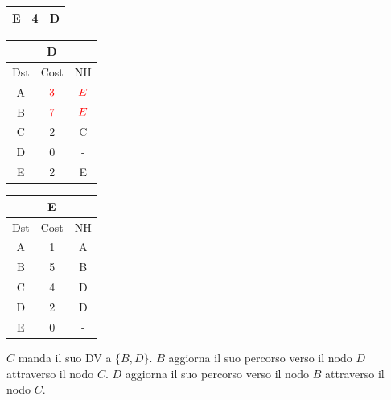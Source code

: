 \documentclass[10pt]{article}
\begin{document}
\begin{table}[h!]
\begin{tabular}{|c||c||c|}
 			E & 4 & D \\
 			\hline
		\end{tabular}
		\begin{tabular}{|c||c||c|}
 			\hline
	 		\multicolumn{3}{|c|}{D} \\
 			\hline
 			Dst & Cost & NH\\
 			\hline
 			A & $\color{red} 3$  & $\color{red} E$ \\
 			B & $\color{red} 7$  & $\color{red} E$ \\
 			C & 2 & C \\
 			D & 0 & - \\
 			E & 2 & E \\
 			\hline
		\end{tabular}
		\begin{tabular}{|c||c||c|}
 			\hline
	 		\multicolumn{3}{|c|}{E} \\
 			\hline
 			Dst & Cost & NH\\
 			\hline
 			A & 1 & A \\
 			B & 5 & B \\
 			C & 4 & D  \\
 			D & 2 & D \\
 			E & 0 & - \\
 			\hline
		\end{tabular}
	\end{table}	
	\newline \newline
	$C$ manda il suo DV a $\{B,D\}$.
	\newline
	$B$ aggiorna il suo percorso verso il nodo $D$ attraverso il nodo $C$.
	\newline
	$D$ aggiorna il suo percorso verso il nodo $B$ attraverso il nodo $C$.
\end{document}
